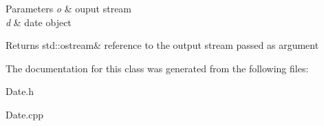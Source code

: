 \begin{DoxyParams}{Parameters}
{\em o} & ouput stream \\
\hline
{\em d} & date object \\
\hline
\end{DoxyParams}
\begin{DoxyReturn}{Returns}
std\+::ostream\& reference to the output stream passed as argument 
\end{DoxyReturn}


The documentation for this class was generated from the following files\+:\begin{DoxyCompactItemize}
\item 
Date.\+h\item 
Date.\+cpp\end{DoxyCompactItemize}

